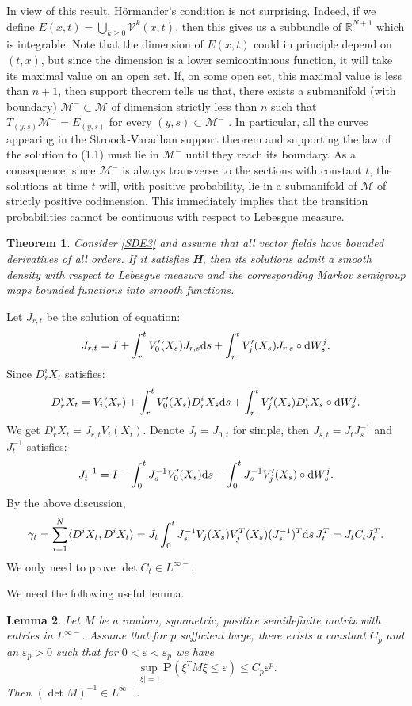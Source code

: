 \documentclass[twoside, 12pt]{book}
\numberwithin{equation}{chapter}
\newtheorem{theorem}{Theorem}[section]
\newtheorem{lemma}[theorem]{Lemma}
\def\cM{{\mathcal M}}
\def\mR{{\mathbb R}}
\def\bP{{\mathbf P}}
\def\sV{{\mathscr V}}
\def\<{\langle}
\def\>{\rangle}
\def\geq{\geqslant}
\def\leq{\leqslant}
\def\d{\text{\rm{d}}}
\def\eps{\varepsilon}
\begin{document}
	In view of this result, H\"ormander’s condition is not surprising. Indeed, if we define $E(x,t) = \bigcup_{k\geq 0} \sV^k(x,t)$, then this gives us a subbundle of $\mR^{N+1}$ which
	is integrable. Note that the dimension of $E(x,t)$ could in principle depend on $(t, x)$, but since the dimension is a lower semicontinuous function, it will take its maximal value on an open set. If, on some open set, this maximal value is less than $n + 1$, then support theorem tells us that, there exists a submanifold (with boundary) $\cM^- \subset \cM$ of dimension strictly less than $n$ such that $T_{(y,s)}\cM^- = E_{(y,s)}$ for every $(y, s) \subset \cM^-$ . In particular, all the curves appearing in the Stroock-Varadhan support theorem and supporting the law of the solution to (1.1) must lie in $\cM^-$ until they reach its boundary. As a consequence, since $\cM^-$ is always transverse to the sections with constant $t$, the solutions at time $t$ will, with positive probability, lie in a submanifold of $\cM$ of strictly positive codimension. This immediately implies that the transition probabilities cannot be continuous with respect to Lebesgue measure.
	
	\begin{theorem}
	Consider \eqref{SDE3} and assume that all vector fields have bounded derivatives of all orders. If it satisfies \textbf{H}, then its solutions admit a smooth density with respect to Lebesgue measure and the corresponding Markov semigroup maps bounded functions into smooth functions.
	\end{theorem}
	
	Let $J_{r,t}$ be the solution of equation: 
	\begin{align}
		J_{r,t}=I+\int_r^t V'_0(X_s) J_{r,s}\d s+\int_r^t V'_j(X_s) J_{r,s}\circ \d W^j_s. 
	\end{align}
	Since $D^i_rX_t$ satisfies: 
	$$D^i_rX_t=V_i(X_r)+\int_r^t V'_0(X_s) D^i_r X_s \d s+\int_r^t V'_j(X_s)D^i_rX_s\circ \d W^j_s. $$
	We get $D^i_rX_t=J_{r,t} V_i(X_t)$. Denote $J_t=J_{0,t}$ for simple, then $J_{s,t}=J_{t}J_{s}^{-1}$ and $J_{t}^{-1}$ satisfies: 
	$$J_t^{-1}=I-\int_0^t J_s^{-1} V'_0(X_s)\d s-\int_0^t J_s^{-1} V'_j(X_s)\circ\d W_s^j. $$
	By the above discussion, 
	$$
	\gamma_t = \sum_{i=1}^N\<D^i X_t, D^i X_t\>=J_t\int_0^t J^{-1}_s V_j(X_s)V^{T}_j(X_s)(J^{-1}_s)^T \d s \,J^T_t=J_t C_t J^T_t. 
	$$
	We only need to prove $\det C_t\in L^{\infty-}$. 
	
	We need the following useful lemma. 
	
	\begin{lemma}\label{Tail}
	Let $M$ be a random, symmetric, positive semidefinite matrix with entries in  $L^{\infty-}.$ Assume that for $p$ sufficient large, there exists a constant $C_p$ and an $\eps_p > 0$ such that
	for $0<\eps<\eps_p$ we have
	$$ \sup_{|\xi|=1}\bP  (\xi^T M \xi\leq \eps)\leq C_p \eps^p. $$
	Then $(\det M)^{-1} \in L^{\infty-}. $
	\end{lemma}
	
\end{document}
